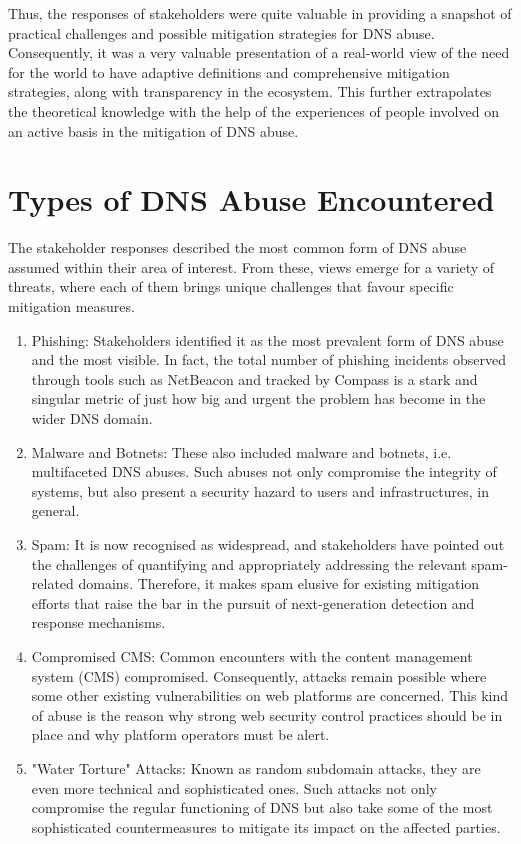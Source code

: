 Thus, the responses of stakeholders were quite valuable in providing a snapshot of practical challenges and possible mitigation strategies for DNS abuse. Consequently, it was a very valuable presentation of a real-world view of the need for the world to have adaptive definitions and comprehensive mitigation strategies, along with transparency in the ecosystem. This further extrapolates the theoretical knowledge with the help of the experiences of people involved on an active basis in the mitigation of DNS abuse.

\section{Types of DNS Abuse Encountered} 

The stakeholder responses described the most common form of DNS abuse assumed within their area of interest. From these, views emerge for a variety of threats, where each of them brings unique challenges that favour specific mitigation measures.

\begin{enumerate}
    \item Phishing: Stakeholders identified it as the most prevalent form of DNS abuse and the most visible. In fact, the total number of phishing incidents observed through tools such as NetBeacon and tracked by Compass is a stark and singular metric of just how big and urgent the problem has become in the wider DNS domain.
    \item Malware and Botnets: These also included malware and botnets, i.e. multifaceted DNS abuses. Such abuses not only compromise the integrity of systems, but also present a security hazard to users and infrastructures, in general.
    \item Spam: It is now recognised as widespread, and stakeholders have pointed out the challenges of quantifying and appropriately addressing the relevant spam-related domains. Therefore, it makes spam elusive for existing mitigation efforts that raise the bar in the pursuit of next-generation detection and response mechanisms.
    \item Compromised CMS: Common encounters with the content management system (CMS) compromised. Consequently, attacks remain possible where some other existing vulnerabilities on web platforms are concerned. This kind of abuse is the reason why strong web security control practices should be in place and why platform operators must be alert.
    \item "Water Torture" Attacks: Known as random subdomain attacks, they are even more technical and sophisticated ones. Such attacks not only compromise the regular functioning of DNS but also take some of the most sophisticated countermeasures to mitigate its impact on the affected parties.
\end{enumerate}

